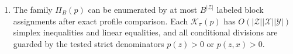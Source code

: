 \begin{enumerate}
\[
 \prod_{x\in\mathcal X}\bigl(L_x+M_x\Delta(\mathcal Y)\bigr),
 \quad
 L_x(y)=\sum_{z:p(z,x)>0}p(z)m_{zx}(y),
 \quad
 M_x=\sum_{z:p(z,x)=0}p(z).
\]
If, in addition, joint positivity \(p(z,x)>0\) holds for every
\((z,x)\), then \(\mathcal K(p)\) is the singleton guarded circuit
\[
 K_M(z,x,y)=m_{zx}(y)=\frac{p(z,x,y)}{p(z,x)}.
\]
\item The family \(\Pi_B(p)\) can be enumerated by at most
\(B^{\lvert\mathcal Z\rvert}\) labeled block assignments after exact
profile comparison.  Each \(\mathcal K_\pi(p)\) has
\(O(\lvert\mathcal Z\rvert\lvert\mathcal X\rvert
\lvert\mathcal Y\rvert)\) simplex inequalities and linear equalities,
and all conditional divisions are guarded by the tested strict
denominators \(p(z)>0\) or \(p(z,x)>0\).
\end{enumerate}